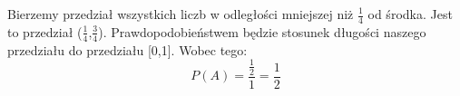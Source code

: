 \medskip
{} 
\medskip

Bierzemy przedział wszystkich liczb w odległości mniejszej niż $ \frac{1}{4}$ od środka. Jest to przedział ($ \frac{1}{4}$,$ \frac{3}{4}$). Prawdopodobieństwem będzie stosunek długości naszego przedziału do przedziału [0,1]. Wobec tego:
$$
P(A)=\frac{\frac{1}{2}}{1}=\frac{1}{2}
$$
